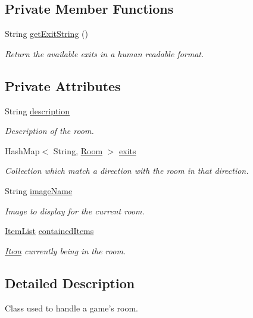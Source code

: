 \subsection*{Private Member Functions}
\begin{DoxyCompactItemize}
\item 
String \hyperlink{classRoom_a2ccc382c07890a9827be232767eb98a0}{get\-Exit\-String} ()
\begin{DoxyCompactList}\small\item\em Return the available exits in a human readable format. \end{DoxyCompactList}\end{DoxyCompactItemize}
\subsection*{Private Attributes}
\begin{DoxyCompactItemize}
\item 
String \hyperlink{classRoom_a2d7ecf802690a6b13750ca6fa6882d77}{description}
\begin{DoxyCompactList}\small\item\em Description of the room. \end{DoxyCompactList}\item 
Hash\-Map$<$ String, \hyperlink{classRoom}{Room} $>$ \hyperlink{classRoom_a29620da10d44de49ee8557e037f014af}{exits}
\begin{DoxyCompactList}\small\item\em Collection which match a direction with the room in that direction. \end{DoxyCompactList}\item 
String \hyperlink{classRoom_a3ddf7c120b54509c43d803d2409158fc}{image\-Name}
\begin{DoxyCompactList}\small\item\em Image to display for the current room. \end{DoxyCompactList}\item 
\hyperlink{classItemList}{Item\-List} \hyperlink{classRoom_a02eea1285ab8d50a2e25cc98d50b185d}{contained\-Items}
\begin{DoxyCompactList}\small\item\em \hyperlink{classItem}{Item} currently being in the room. \end{DoxyCompactList}\end{DoxyCompactItemize}


\subsection{Detailed Description}
Class used to handle a game's room. 

